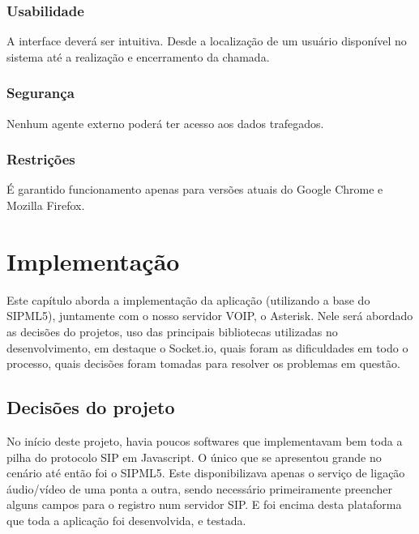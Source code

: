 \documentclass[ruledheader]{abnt} %
\begin{document}
\subsection{Usabilidade}
\label{ss_usabilidade}
A interface deverá ser intuitiva. Desde a localização de um usuário disponível no sistema até a realização e encerramento da chamada.

\subsection{Segurança}
\label{ss_seguranca}
Nenhum agente externo poderá ter acesso aos dados trafegados.

\subsection{Restrições}
\label{ss_restricoes}
É garantido funcionamento apenas para versões atuais do Google Chrome e Mozilla Firefox.






\chapter{Implementação}
\label{c_implementacao}

Este capítulo aborda a implementação da aplicação (utilizando a base do SIPML5), juntamente com o nosso servidor VOIP, o Asterisk. Nele será abordado as decisões do projetos, uso das principais bibliotecas utilizadas no desenvolvimento, em destaque o Socket.io, quais foram as dificuldades em todo o processo, quais decisões foram tomadas para resolver os problemas em questão.
 
\section{Decisões do projeto}
\label{s_decisoesDoProjeto} %
No início deste projeto, havia poucos softwares que implementavam bem toda a pilha do protocolo SIP em Javascript. O único que se apresentou grande no cenário até então foi o SIPML5. Este disponibilizava apenas o serviço de ligação áudio/vídeo de uma ponta a outra, sendo necessário primeiramente preencher alguns campos para o registro num servidor SIP. E foi encima desta plataforma que toda a aplicação foi desenvolvida, e testada.
\end{document}
